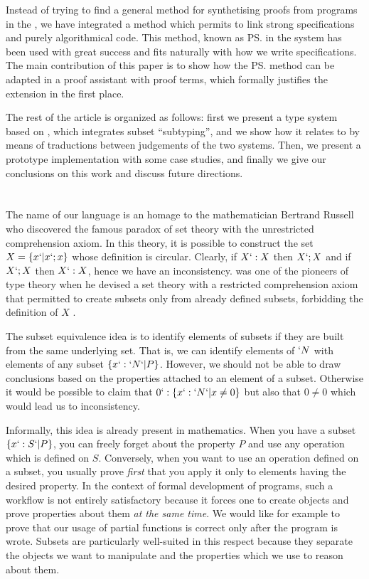 \documentclass{llncs}
\begin{document}
Instead of trying to find a general method for synthetising proofs from
programs in the \CICfull, we have integrated a method which permits to
link strong specifications and purely algorithmical code. This method,
known as \ps{} in the \PVS{} system has been used with great success and
fits naturally with how we write specifications. The main contribution
of this paper is to show how the \ps{} method can be adapted in a proof
assistant with proof terms, which formally justifies the extension in
the first place.

The rest of the article is organized as follows: first we present a
type system based on \ECC{}, which integrates subset ``subtyping'', and
we show how it relates to \CIC{} by means of traductions between
judgements of the two systems. Then, we present a prototype
implementation with some case studies, and finally we give our
conclusions on this work and discuss future directions.

\section{\Russell{}}
The name of our language is an homage to the mathematician Bertrand Russell who
discovered the famous paradox of set theory with the unrestricted
comprehension axiom. In this theory, it is possible to construct the set
$X = \{x `| x `; x\}$ whose definition is circular. Clearly, if $X `: X$
then $X `; X$ and if $X `; X$ then $X `: X$, hence we have an
inconsistency. \Russell{} was one of the pioneers of type theory when he
devised a set theory with a restricted comprehension axiom that
permitted to create subsets only from already defined subsets,
forbidding the definition of $X$ \cite{whitehead.russell:principia}. 

The subset equivalence idea is to identify elements of subsets if
they are built from the same underlying set. That is, we can identify
elements of $`N$ with elements of any subset $\{ x `: `N `| P \}$.
However, we should not be able to draw conclusions based on the
properties attached to an element of a subset. Otherwise it would be
possible to claim that $0 `: \{ x `: `N `| x \neq 0 \}$ but also that $0
\neq 0$ which would lead us to inconsistency. 

Informally, this idea is already present in mathematics. When you have a
subset $\{ x `: S `| P \}$, you can freely forget about the property $P$
and use any operation which is defined on $S$. Conversely, when you
want to use an operation defined on a subset, you usually prove \emph{first}
that you apply it only to elements having the desired property. 
In the context of formal development of programs, such a workflow is not
entirely satisfactory because it forces one to create objects and prove
properties about them \emph{at the same time}. We would like for example
to prove that our usage of partial functions is correct only after the
program is wrote. Subsets are particularly well-suited in this respect
because they separate the objects we want to manipulate and the
properties which we use to reason about them.
\end{document}
